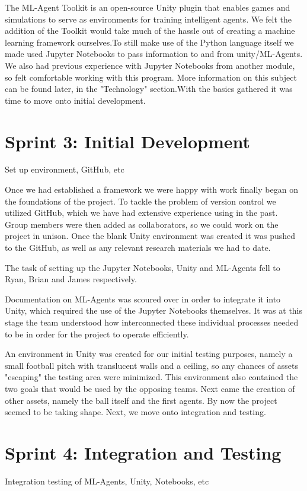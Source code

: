 	The ML-Agent Toolkit is an open-source Unity plugin that enables games and simulations to serve as environments for training intelligent agents. We felt the addition of the Toolkit would take much of the hassle out of creating a machine learning framework ourselves.To still make use of the Python language itself we made used Jupyter Notebooks to pass information to and from unity/ML-Agents. We also had previous experience with Jupyter Notebooks from another module, so felt comfortable working with this program.
	More information on this subject can be found later, in the "Technology" section.With the basics gathered it was time to move onto initial development.
	

\section{Sprint 3: Initial Development}
	Set up environment, GitHub, etc
	
	Once we had established a framework we were happy with work finally began on the foundations of the project. To tackle the problem of version control we utilized GitHub, which we have had extensive experience using in the past. Group members were then added as collaborators, so we could work on the project in unison.  Once the blank Unity environment was created it was pushed to the GitHub, as well as any relevant research materials we had to date.
	
	The task of setting up the Jupyter Notebooks, Unity and ML-Agents fell to Ryan, Brian and James respectively.
	
	Documentation on ML-Agents was scoured over in order to integrate it into Unity, which required the use of the Jupyter Notebooks themselves. It was at this stage the team understood how interconnected these individual processes needed to be in order for the project to operate efficiently.
	
	An environment in Unity was created for our initial testing purposes, namely a small football pitch with translucent walls and a ceiling, so any chances of assets "escaping" the testing area were minimized. This environment also contained the two goals that would be used by the opposing teams. Next came the creation of other assets, namely the ball itself and the first agents. By now the project seemed to be taking shape. Next, we move onto integration and testing.
	
	

\section{Sprint 4: Integration and Testing}
	Integration testing of ML-Agents, Unity, Notebooks, etc
	
